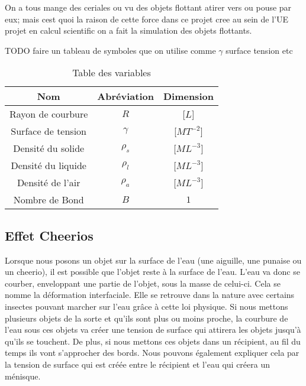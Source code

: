 On a tous mange des ceriales ou vu des objets flottant atirer vers ou pouse par eux; mais cest quoi la raison de cette force dans ce projet cree au sein de l'UE projet en calcul scientific on a fait la simulation des objets flottants.

TODO faire un tableau de symboles que on utilise comme \(\gamma\) surface tension etc

\begin{table}
    \centering
    \begin{tabular}{ccc}
        \hline
        Nom                & Abréviation & Dimension\\
        \hline
        Rayon de courbure  & $R$         & [$L$]\\
        Surface de tension & $\gamma$    & [$MT^{-2}$]\\ 
        Densité du solide  & $\rho_s$    & [$ML^{-3}$]\\
        Densité du liquide & $\rho_l$    & [$ML^{-3}$]\\
        Densité de l'air   & $\rho_a$    & [$ML^{-3}$]\\
        Nombre de Bond     & $B$         & $1$\\
        \hline
    \end{tabular}
    \caption{Table des variables}
\end{table}

\subsection{Effet Cheerios}
    Lorsque nous posons un objet sur la surface de l'eau (une aiguille, une punaise ou un cheerio), il est possible que l'objet reste à la surface de l'eau. L'eau va donc se courber, enveloppant une partie de l'objet, sous la masse de celui-ci. Cela se nomme la déformation interfaciale. Elle se retrouve dans la nature avec certains insectes pouvant marcher sur l'eau grâce à cette loi physique. Si nous mettons plusieurs objets de la sorte et qu'ils sont plus ou moins proche, la courbure de l'eau sous ces objets va créer une tension de surface qui attirera les objets jusqu'à qu'ils se touchent. De plus, si nous mettons ces objets dans un récipient, au fil du temps ils vont s'approcher des bords. Nous pouvons également expliquer cela par la tension de surface qui est créée entre le récipient et l'eau qui créera un ménisque.

